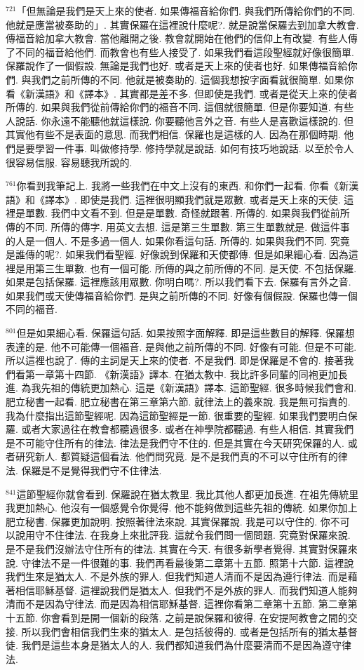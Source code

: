 \documentclass{book}
\begin{document}
$^{721}$「但無論是我們是天上來的使者.
如果傳福音給你們.
與我們所傳給你們的不同.
他就是應當被奏助的」.
其實保羅在這裡說什麼呢?.
就是說當保羅去到加拿大教會.
傳福音給加拿大教會.
當他離開之後.
教會就開始在他們的信仰上有改變.
有些人傳了不同的福音給他們.
而教會也有些人接受了.
如果我們看這段聖經就好像很簡單.
保羅說作了一個假設.
無論是我們也好.
或者是天上來的使者也好.
如果傳福音給你們.
與我們之前所傳的不同.
他就是被奏助的.
這個我想按字面看就很簡單.
如果你看《新漢語》和《譯本》.
其實都是差不多.
但即使是我們.
或者是從天上來的使者所傳的.
如果與我們從前傳給你們的福音不同.
這個就很簡單.
但是你要知道.
有些人說話.
你永遠不能聽他就這樣說.
你要聽他言外之音.
有些人是喜歡這樣說的.
但其實他有些不是表面的意思.
而我們相信.
保羅也是這樣的人.
因為在那個時期.
他們是要學習一件事.
叫做修持學.
修持學就是說話.
如何有技巧地說話.
以至於令人很容易信服.
容易聽我所說的.

$^{761}$你看到我筆記上.
我將一些我們在中文上沒有的東西.
和你們一起看.
你看《新漢語》和《譯本》.
即使是我們.
這裡很明顯我們就是眾數.
或者是天上來的天使.
這裡是單數.
我們中文看不到.
但是是單數.
奇怪就跟著.
所傳的.
如果與我們從前所傳的不同.
所傳的傳字.
用英文去想.
這是第三生單數.
第三生單數就是.
做這件事的人是一個人.
不是多過一個人.
如果你看這句話.
所傳的.
如果與我們不同.
究竟是誰傳的呢?.
如果我們看聖經.
好像說到保羅和天使都傳.
但是如果細心看.
因為這裡是用第三生單數.
也有一個可能.
所傳的與之前所傳的不同.
是天使.
不包括保羅.
如果是包括保羅.
這裡應該用眾數.
你明白嗎?.
所以我們看下去.
保羅有言外之音.
如果我們或天使傳福音給你們.
是與之前所傳的不同.
好像有個假設.
保羅也傳一個不同的福音.

$^{801}$但是如果細心看.
保羅這句話.
如果按照字面解釋.
即是這些數目的解釋.
保羅想表達的是.
他不可能傳一個福音.
是與他之前所傳的不同.
好像有可能.
但是不可能.
所以這裡也說了.
傳的主詞是天上來的使者.
不是我們.
即是保羅是不會的.
接著我們看第一章第十四節.
《新漢語》譯本.
在猶太教中.
我比許多同輩的同袍更加長進.
為我先祖的傳統更加熱心.
這是《新漢語》譯本.
這節聖經.
很多時候我們會和.
肥立秘書一起看.
肥立秘書在第三章第六節.
就律法上的義來說.
我是無可指責的.
我為什麼指出這節聖經呢.
因為這節聖經是一節.
很重要的聖經.
如果我們要明白保羅.
或者大家過往在教會都聽過很多.
或者在神學院都聽過.
有些人相信.
其實我們是不可能守住所有的律法.
律法是我們守不住的.
但是其實在今天研究保羅的人.
或者研究新人.
都質疑這個看法.
他們問究竟.
是不是我們真的不可以守住所有的律法.
保羅是不是覺得我們守不住律法.

$^{841}$這節聖經你就會看到.
保羅說在猶太教里.
我比其他人都更加長進.
在祖先傳統里我更加熱心.
他沒有一個感覺令你覺得.
他不能夠做到這些先祖的傳統.
如果你加上肥立秘書.
保羅更加說明.
按照著律法來說.
其實保羅說.
我是可以守住的.
你不可以說用守不住律法.
在我身上來批評我.
這就令我們問一個問題.
究竟對保羅來說.
是不是我們沒辦法守住所有的律法.
其實在今天.
有很多新學者覺得.
其實對保羅來說.
守律法不是一件很難的事.
我們再看最後第二章第十五節.
照第十六節.
這裡說我們生來是猶太人.
不是外族的罪人.
但我們知道人清而不是因為遵行律法.
而是藉著相信耶穌基督.
這裡說我們是猶太人.
但我們不是外族的罪人.
而我們知道人能夠清而不是因為守律法.
而是因為相信耶穌基督.
這裡你看第二章第十五節.
第二章第十五節.
你會看到是開一個新的段落.
之前是說保羅和彼得.
在安提阿教會之間的交接.
所以我們會相信我們生來的猶太人.
是包括彼得的.
或者是包括所有的猶太基督徒.
我們是這些本身是猶太人的人.
我們都知道我們為什麼要清而不是因為遵守律法.
\end{document}
